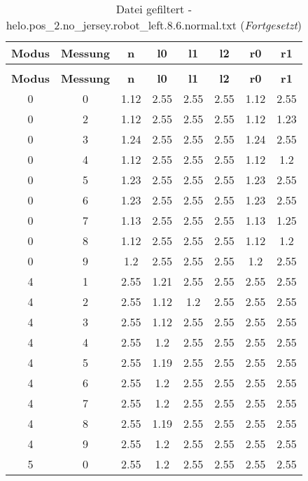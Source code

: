 \clearpage{}
\begin{longtable}{|c|c||c||c|c|c||c|c|}
	\caption{Datei gefiltert - helo.pos\_2.no\_jersey.robot\_left.8.6.normal.txt} \label{tab:helo.pos-2.no-jersey.robot-left.8.6.normal.txt} \\ \hline
	\textbf{Modus} & \textbf{Messung} & \textbf{n} & \textbf{l0} & \textbf{l1} & \textbf{l2} & \textbf{r0} & \textbf{r1}\\ \hline
	\endfirsthead
	\caption[]{Datei gefiltert - helo.pos\_2.no\_jersey.robot\_left.8.6.normal.txt (\emph{Fortgesetzt})} \\ \hline
	\textbf{Modus} & \textbf{Messung} & \textbf{n} & \textbf{l0} & \textbf{l1} & \textbf{l2} & \textbf{r0} & \textbf{r1}\\ \hline
	\endhead
	0 & 0 & 1.12 & 2.55 & 2.55 & 2.55 & 1.12 & 2.55 \\ \hline
	0 & 2 & 1.12 & 2.55 & 2.55 & 2.55 & 1.12 & 1.23 \\ \hline
	0 & 3 & 1.24 & 2.55 & 2.55 & 2.55 & 1.24 & 2.55 \\ \hline
	0 & 4 & 1.12 & 2.55 & 2.55 & 2.55 & 1.12 & 1.2 \\ \hline
	0 & 5 & 1.23 & 2.55 & 2.55 & 2.55 & 1.23 & 2.55 \\ \hline
	0 & 6 & 1.23 & 2.55 & 2.55 & 2.55 & 1.23 & 2.55 \\ \hline
	0 & 7 & 1.13 & 2.55 & 2.55 & 2.55 & 1.13 & 1.25 \\ \hline
	0 & 8 & 1.12 & 2.55 & 2.55 & 2.55 & 1.12 & 1.2 \\ \hline
	0 & 9 & 1.2 & 2.55 & 2.55 & 2.55 & 1.2 & 2.55 \\ \hline
	4 & 1 & 2.55 & 1.21 & 2.55 & 2.55 & 2.55 & 2.55 \\ \hline
	4 & 2 & 2.55 & 1.12 & 1.2 & 2.55 & 2.55 & 2.55 \\ \hline
	4 & 3 & 2.55 & 1.12 & 2.55 & 2.55 & 2.55 & 2.55 \\ \hline
	4 & 4 & 2.55 & 1.2 & 2.55 & 2.55 & 2.55 & 2.55 \\ \hline
	4 & 5 & 2.55 & 1.19 & 2.55 & 2.55 & 2.55 & 2.55 \\ \hline
	4 & 6 & 2.55 & 1.2 & 2.55 & 2.55 & 2.55 & 2.55 \\ \hline
	4 & 7 & 2.55 & 1.2 & 2.55 & 2.55 & 2.55 & 2.55 \\ \hline
	4 & 8 & 2.55 & 1.19 & 2.55 & 2.55 & 2.55 & 2.55 \\ \hline
	4 & 9 & 2.55 & 1.2 & 2.55 & 2.55 & 2.55 & 2.55 \\ \hline
	5 & 0 & 2.55 & 1.2 & 2.55 & 2.55 & 2.55 & 2.55 \\ \hline

\end{longtable}
